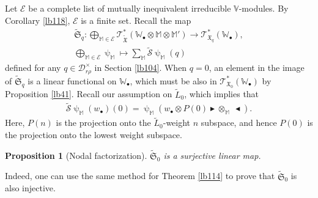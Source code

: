 \documentclass[12pt,b5paper,notitlepage]{report}
\theoremstyle{definition}
\theoremstyle{plain}
\newtheorem{pp}[df]{Proposition}
\newcommand{\fk}{\mathfrak}
\newcommand{\mc}{\mathcal}
\newcommand{\wtd}{\widetilde}
\newcommand{\scr}{\mathscr}
\newcommand{\blt}{\bullet}
\newcommand{\Vbb}{\mathbb V}
\newcommand{\Wbb}{\mathbb W}
\newcommand{\Mbb}{\mathbb M}
\newcommand{\btl}{\blacktriangleleft}
\newcommand{\btr}{\blacktriangleright}
\numberwithin{equation}{section}
\begin{document}
Let $\mc E$ be a complete list of mutually inequivalent irreducible $\Vbb$-modules.  By Corollary \ref{lb118}, $\mc E$ is a finite set. Recall the map
\begin{gather*}
\wtd{\fk S}_q:\bigoplus_{\Mbb\in\mc E}\scr T_{\wtd{\fk X}}^*(\Wbb_\blt\otimes\Mbb\otimes\Mbb')\rightarrow\scr T_{\fk X_q}^*(\Wbb_\blt),\\
\bigoplus_{\Mbb\in\mc E}\uppsi_\Mbb\mapsto\sum_{\Mbb}\wtd{\mc S}\uppsi_\Mbb(q)
\end{gather*}
defined for any $q\in\mc D_{r\rho}^\times$ in Section \ref{lb104}. When $q=0$, an element in the image of $\wtd{\fk S}_q$ is a linear functional on $\Wbb_\blt$, which must be also in $\scr T_{\fk X_0}^*(\Wbb_\blt)$ by Proposition \ref{lb41}.  Recall our assumption on $\wtd L_0$, which implies that
\begin{align*}
\wtd{\mc S}\uppsi_\Mbb(w_\blt)(0)=\uppsi_\Mbb(w_\blt\otimes P(0)\btr\otimes_\Mbb~\btl).
\end{align*}
Here, $P(n)$ is the projection onto the $\wtd L_0$-weight $n$ subspace, and hence $P(0)$ is the projection onto the lowest weight subspace.


\begin{pp}[Nodal factorization]\label{lb120}
$\wtd{\fk S}_0$ is a surjective linear map.
\end{pp}

Indeed, one can use the same method for Theorem \ref{lb114} to prove that $\wtd{\fk S}_0$ is also injective.
\end{document}
